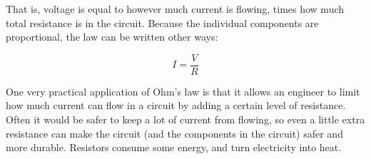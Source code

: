 That is, voltage is equal to however much current is flowing, times how much total resistance is in the circuit. Because the individual components are proportional, the law can be written other ways:

\begin{equation}
I =  \frac{V}{R}
\end{equation}

One very practical application of Ohm's law is that it allows an engineer to limit how much current can flow in a circuit by adding a certain level of resistance. Often it would be safer to keep a lot of current from flowing, so even a little extra resistance can make the circuit (and the components in the circuit) safer and more durable. Resistors consume some energy, and turn electricity into heat.



